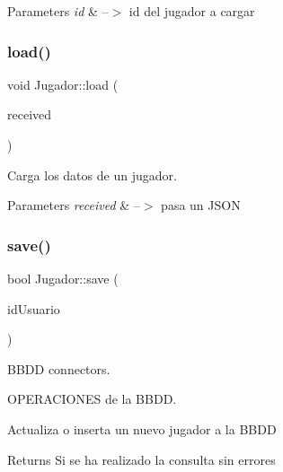 \begin{DoxyParams}{Parameters}
{\em id} & --$>$ id del jugador a cargar \\
\hline
\end{DoxyParams}
\mbox{\label{classJugador_ae2da8cec1afc1c566872dcc27f41e955}} 
\subsubsection{\texorpdfstring{load()}{load()}\hspace{0.1cm}{\footnotesize\ttfamily [2/2]}}
{\footnotesize\ttfamily void Jugador\+::load (\begin{DoxyParamCaption}\item[{\mbox{\hyperlink{jugador_8h_ab6104b89642419db4e355b7b2e40abbe}{J\+S\+ON}}}]{received }\end{DoxyParamCaption})}



Carga los datos de un jugador. 


\begin{DoxyParams}{Parameters}
{\em received} & --$>$ pasa un J\+S\+ON \\
\hline
\end{DoxyParams}
\mbox{\label{classJugador_aeeb38c07c438551fd1d43a963e3b0b15}} 
\subsubsection{\texorpdfstring{save()}{save()}}
{\footnotesize\ttfamily bool Jugador\+::save (\begin{DoxyParamCaption}\item[{int}]{id\+Usuario }\end{DoxyParamCaption})}



B\+B\+DD connectors. 

O\+P\+E\+R\+A\+C\+I\+O\+N\+ES de la B\+B\+DD.

Actualiza o inserta un nuevo jugador a la B\+B\+DD \begin{DoxyReturn}{Returns}
Si se ha realizado la consulta sin errores 
\end{DoxyReturn}
\mbox{\label{classJugador_ad272be7c6b113eee1c9baf1262c4ad95}} 

